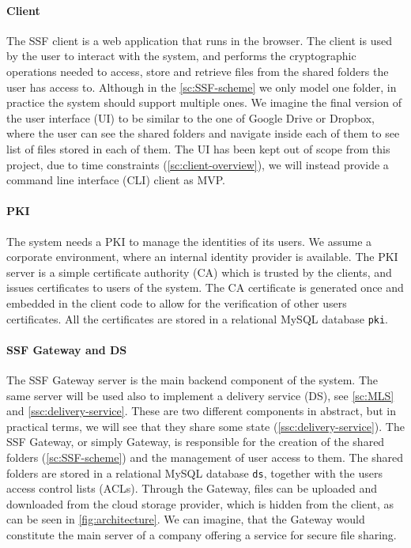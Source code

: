 \paragraph{Client} The SSF client is a web application that
runs in the browser. The client is used by the user to
interact with the system, and performs the cryptographic
operations needed to access, store and retrieve files 
from the shared folders the user has access to.
Although in the \cref{sc:SSF-scheme} we only model one folder,
in practice the system should support multiple ones.
We imagine the final version of the user interface (UI) to
be similar to the one of Google Drive or Dropbox, where
the user can see the shared folders and navigate inside each
of them to see list of files stored in each of them.
The UI has been kept out of scope from this project, due to
time constraints (\cref{sc:client-overview}), we will
instead provide a command line interface (CLI) client
as MVP.

\paragraph{PKI} The system needs a PKI to manage the identities
of its users. We assume a corporate environment, where
an internal identity provider is available. The PKI server
is a simple certificate authority (CA) which is trusted
by the clients, and issues certificates to users of the system.
The CA certificate is generated once and embedded in the client
code to allow for the verification of other users certificates.
All the certificates are stored in a relational MySQL database \texttt{pki}.

\paragraph{SSF Gateway and DS}
The SSF Gateway server is the main backend component of the system.
The same server will be used also to implement a delivery service (DS), see \cref{sc:MLS} and \cref{ssc:delivery-service}.
These are two different components in abstract, but in practical terms, 
we will see that they share some state (\cref{ssc:delivery-service}).
The SSF Gateway, or simply Gateway, is responsible for the
creation of the shared folders (\cref{sc:SSF-scheme}) and the management of user access
to them. The shared folders are stored in a relational MySQL
database \texttt{ds}, together with the users access control lists (ACLs).
Through the Gateway, files can be uploaded and downloaded 
from the cloud storage provider, which is hidden from the client,
as can be seen in \cref{fig:architecture}.
We can imagine, that the Gateway would constitute the main
server of a company offering a service for secure file sharing.

